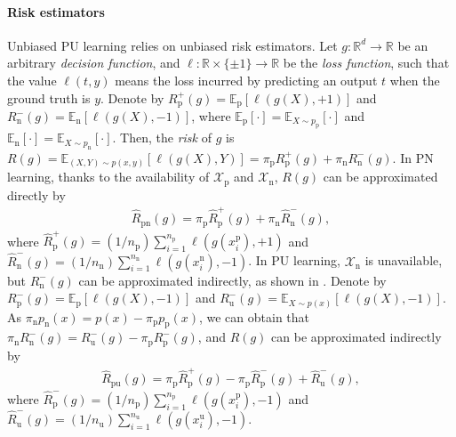 \documentclass{article}
\newcommand{\bE}{\mathbb{E}}
\newcommand{\bR}{\mathbb{R}}
\newcommand{\cX}{\mathcal{X}}
\newcommand{\prp}{p_\mathrm{p}}
\newcommand{\prn}{p_\mathrm{n}}
\newcommand{\pip}{\pi_\mathrm{p}}
\newcommand{\pin}{\pi_\mathrm{n}}
\newcommand{\Xp}{\cX_\mathrm{p}}
\newcommand{\Xn}{\cX_\mathrm{n}}
\newcommand{\xp}{x^\mathrm{p}}
\newcommand{\xn}{x^\mathrm{n}}
\newcommand{\xu}{x^\mathrm{u}}
\newcommand{\Np}{{n_\mathrm{p}}}
\newcommand{\Nn}{{n_\mathrm{n}}}
\newcommand{\Nu}{{n_\mathrm{u}}}
\newcommand{\Rp}{R_\mathrm{p}}
\newcommand{\Rn}{R_\mathrm{n}}
\newcommand{\Ru}{R_\mathrm{u}}
\newcommand{\hRp}{\widehat{R}_\mathrm{p}}
\newcommand{\hRn}{\widehat{R}_\mathrm{n}}
\newcommand{\hRu}{\widehat{R}_\mathrm{u}}
\newcommand{\hRpn}{\widehat{R}_\mathrm{pn}}
\newcommand{\hRpu}{\widehat{R}_\mathrm{pu}}
\begin{document}
\paragraph{Risk estimators}
Unbiased PU learning relies on unbiased risk estimators. Let $g:\bR^d\to\bR$ be an arbitrary \emph{decision function}, and $\ell:\bR\times\{\pm1\}\to\bR$ be the \emph{loss function}, such that the value $\ell(t,y)$ means the loss incurred by predicting an output $t$ when the ground truth is $y$. Denote by $\Rp^+(g)=\bE_\mathrm{p}[\ell(g(X),+1)]$ and $\Rn^-(g)=\bE_\mathrm{n}[\ell(g(X),-1)]$, where $\bE_\mathrm{p}[\cdot]=\bE_{X\sim\prp}[\cdot]$ and $\bE_\mathrm{n}[\cdot]=\bE_{X\sim\prn}[\cdot]$. Then, the \emph{risk} of $g$ is $R(g)=\bE_{(X,Y)\sim p(x,y)}[\ell(g(X),Y)]=\pip\Rp^+(g)+\pin\Rn^-(g)$. In PN learning, thanks to the availability of $\Xp$ and $\Xn$, $R(g)$ can be approximated directly by
\begin{align}
\label{eq:risk-pn-hat}%
\hRpn(g)=\pip\hRp^+(g)+\pin\hRn^-(g),
\end{align}
where $\hRp^+(g)=(1/\Np)\sum_{i=1}^\Np\ell(g(\xp_i),+1)$ and $\hRn^-(g)=(1/\Nn)\sum_{i=1}^\Nn\ell(g(\xn_i),-1)$. In PU learning, $\Xn$ is unavailable, but $\Rn^-(g)$ can be approximated indirectly, as shown in \citep{christo14nips,christo15icml}. Denote by $\Rp^-(g)=\bE_\mathrm{p}[\ell(g(X),-1)]$ and $\Ru^-(g)=\bE_{X\sim p(x)}[\ell(g(X),-1)]$. As $\pin\prn(x)=p(x)-\pip\prp(x)$, we can obtain that $\pin\Rn^-(g)=\Ru^-(g)-\pip\Rp^-(g)$, and $R(g)$ can be approximated indirectly by
\begin{align}
\label{eq:risk-pu-hat}%
\hRpu(g)=\pip\hRp^+(g)-\pip\hRp^-(g)+\hRu^-(g),
\end{align}
where $\hRp^-(g)=(1/\Np)\sum_{i=1}^\Np\ell(g(\xp_i),-1)$ and $\hRu^-(g)=(1/\Nu)\sum_{i=1}^\Nu\ell(g(\xu_i),-1)$.
\end{document}
